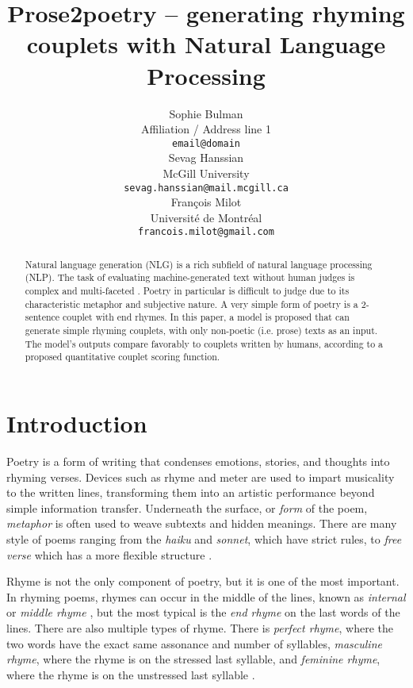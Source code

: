 \documentclass[11pt,a4paper]{article}
\title{Prose2poetry -- generating rhyming couplets with Natural Language Processing}
\author{Sophie Bulman \\
  Affiliation / Address line 1 \\
  \texttt{email@domain} \\\And
  Sevag Hanssian \\
  McGill University \\
  \texttt{sevag.hanssian@mail.mcgill.ca} \\\AND
  François Milot \\
  Université de Montréal \\
  \texttt{francois.milot@gmail.com} \\}
\date{}
\begin{document}
\maketitle
\begin{abstract}
	Natural language generation (NLG) is a rich subfield of natural language processing (NLP). The task of evaluating machine-generated text without human judges is complex and multi-faceted \cite{nlgeval}. Poetry in particular is difficult to judge due to its characteristic metaphor and subjective nature. A very simple form of poetry is a 2-sentence couplet with end rhymes. In this paper, a model is proposed that can generate simple rhyming couplets, with only non-poetic (i.e. prose) texts as an input. The model's outputs compare favorably to couplets written by humans, according to a proposed quantitative couplet scoring function.
\end{abstract}

\section{Introduction}
\label{sec:intro}

Poetry is a form of writing that condenses emotions, stories, and thoughts into rhyming verses. Devices such as rhyme and meter are used to impart musicality to the written lines, transforming them into an artistic performance beyond simple information transfer. Underneath the surface, or \textit{form} of the poem, \textit{metaphor} is often used to weave subtexts and hidden meanings. There are many style of poems ranging from the \textit{haiku} and \textit{sonnet}, which have strict rules, to \textit{free verse} which has a more flexible structure \citep{poem_type}.

Rhyme is not the only component of poetry, but it is one of the most important. In rhyming poems, rhymes can occur in the middle of the lines, known as \textit{internal} or \textit{middle rhyme} \cite{internal_rhyme_def}, but the most typical is the \textit{end rhyme} \cite{end_rhyme_def} on the last words of the lines. There are also multiple types of rhyme. There is \textit{perfect rhyme}, where the two words have the exact same assonance and number of syllables, \textit{masculine rhyme}, where the rhyme is on the stressed last syllable, and \textit{feminine rhyme}, where the rhyme is on the unstressed last syllable \citep{poem_rhyme_type}.
\end{document}
